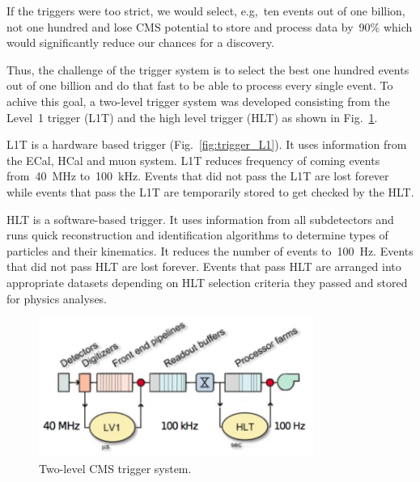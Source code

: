 If the triggers were too strict, we would select, e.g,~ten events out of one billion, not one hundred and lose CMS potential to store and process data by~90\% which would significantly reduce our chances for a discovery.

Thus, the challenge of the trigger system is to select the best one hundred events out of one billion and do that fast to be able to process every single event. To achive this goal, a two-level trigger system was developed consisting from the Level~1 trigger (L1T) and the high level trigger (HLT) as shown in Fig.~\ref{fig:trigger_2level}.

L1T is a hardware based trigger (Fig.~\ref{fig:trigger_L1}). It uses information from the ECal, HCal and muon system. L1T reduces frequency of coming events from~40~MHz to~100~kHz. Events that did not pass the L1T are lost forever while events that pass the L1T are temporarily stored to get checked by the HLT.

HLT is a software-based trigger. It uses information from all subdetectors and runs quick reconstruction and identification algorithms to determine types of particles and their kinematics. It reduces the number of events to~100~Hz. Events that did not pass HLT are lost forever. Events that pass HLT are arranged into appropriate datasets depending on HLT selection criteria they passed and stored for physics analyses.

\begin{figure}[htb]
  \begin{center}
    \includegraphics[width=0.8\textwidth]{../figs/Exp/trigger_2level.png}
    \caption{Two-level CMS trigger system.}
    \label{fig:trigger_2level}
  \end{center}
\end{figure}


